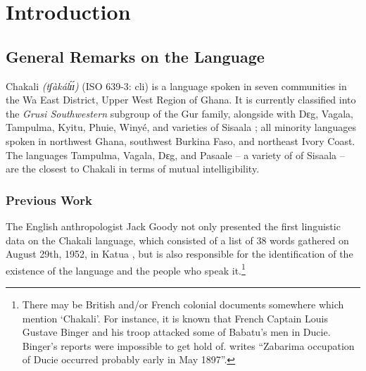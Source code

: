



\chapter{Introduction}
\label{sec:intro}

\section{General Remarks on the Language}
\label{sec:background}

Chakali  {\it (tʃàkálɪ́ɪ́)} (ISO 639-3: cli) is a language  spoken in seven 
communities in the Wa 
East District, Upper West Region of Ghana.   It is currently classified  into 
the {\it 
 Grusi Southwestern} subgroup of the Gur family, alongside with Dɛg, 
Vagala, 
Tampulma, Kyitu, Phuie, Winyé, and varieties of Sisaala \citep{lewi14, hamm14}; 
all minority languages spoken in northwest Ghana, southwest Burkina Faso,  and 
northeast Ivory Coast.  The languages  Tampulma, Vagala, Dɛg, 
and  Pasaale -- a variety of  of Sisaala --  are the closest to Chakali in 
terms 
of mutual intelligibility.


\subsection{Previous Work}
\label{sec:chrono}

The English anthropologist Jack Goody  not only  presented the first linguistic 
data on the Chakali language, which consisted of a list of 38 words gathered  
on August 29th, 1952,  in Katua \citep[33]{Good54}, but  is also 
responsible 
for the identification of the existence of the language and the people who 
speak 
it.\footnote{There may be British and/or French colonial documents somewhere 
which mention `Chakali'. For instance,  it is known that French Captain  
Louis Gustave Binger 
and his troop attacked some of Babatu's men in  Ducie.  Binger's reports were 
impossible to get hold of. \citet[133]{Wilk89} writes ``Zabarima occupation of 
Ducie occurred probably early in May 1897''.}


